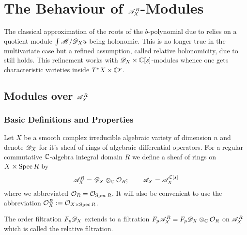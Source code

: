 \chapter{The Behaviour of $\mathscr{A}_X^R$-Modules}
The classical approximation of the roots of the $b$-polynomial due to \cite{kashiwara1976b} relies on a quotient module $\int \mathscr{M} / \mathscr{D}_X u$ being holonomic.
This is no longer true in the multivariate case but a refined assumption, called relative holonomicity, due to \cite{maisonobe2016filtration} still holds.
This refinement works with $\mathscr{D}_X\times\mathbb{C}[s]$-modules whence one gets characteristic varieties inside $T^*X \times \mathbb{C}^p$.

\section{Modules over $\mathscr{A}_X^R$}
\subsection{Basic Definitions and Properties}
Let $X$ be a smooth complex irreducible algebraic variety of dimension $n$ and denote $\mathscr{D}_X$ for it's sheaf of rings of algebraic differential operators.
For a regular commutative $\mathbb{C}$-algebra integral domain $R$ we define a sheaf of rings on $X\times \operatorname{Spec} R$ by
$$\mathscr{A}_{X}^R = \mathscr{D}_X \otimes_{\mathbb{C}} \mathcal{O}_{R}; \qquad \mathscr{A}_X = \mathscr{A}_{X}^{\mathbb{C}[s]}$$
where we abbreviated $\mathcal{O}_R = \mathcal{O}_{\operatorname{Spec} R}$. It will also be convenient to use the abbreviation $\mathcal{O}_{X}^R := \mathcal{O}_{X \times \operatorname{Spec} R}$.


The order filtration $F_p\mathscr{D}_X$ extends to a filtration $F_p\mathscr{A}^R_X = F_p\mathscr{D}_X \otimes_{\mathbb{C}} \mathcal{O}_R$ on $\mathscr{A}^R_X$ which is called the relative filtration.


